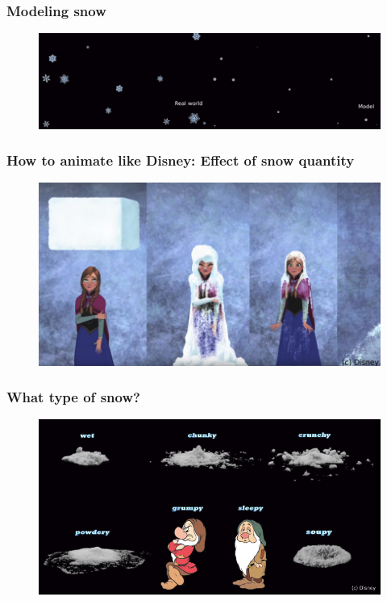 \documentclass[notes]{beamer}
\begin{document}
\begin{frame}
	\frametitle{Modeling snow}
	\begin{figure}[ht]
		\centering
		\includegraphics[width=\textwidth]{figs/snow-model.png}
	\end{figure}
\end{frame}

\begin{frame}
	\frametitle{How to animate like Disney: Effect of snow quantity}
	\begin{figure}[ht]
		\centering
		\includegraphics[width=\textwidth]{figs/anna-quantity-snow.png}
	\end{figure}
\end{frame}

\begin{frame}
	\frametitle{What type of snow?}
	\begin{figure}[ht]
		\centering
		\includegraphics[width=\textwidth]{figs/snow-types.png}
	\end{figure}
\end{frame}
\end{document}
